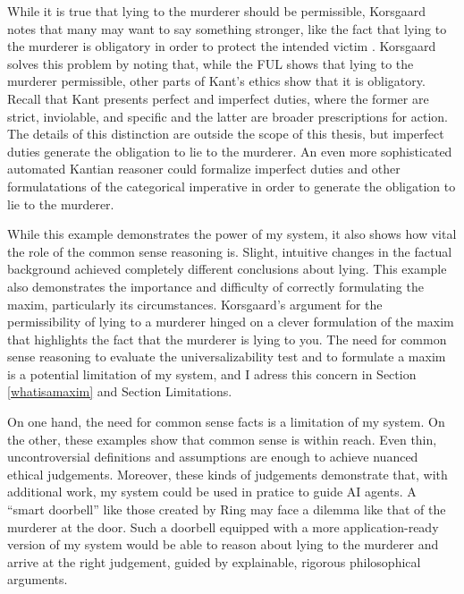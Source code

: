 \begin{isabellebody}
\begin{isamarkuptext}
{While it is true that lying to the murderer should be permissible, Korsgaard notes that many may want
to say something stronger, like the fact that lying to the murderer is obligatory in order to protect
the intended victim \citep[15]{KorsgaardRTL}. Korsgaard solves this problem by 
noting that, while the FUL shows that lying to the murderer permissible, other parts of Kant's ethics
show that it is obligatory. Recall that Kant presents perfect and imperfect duties,
where the former are strict, inviolable, and specific and the latter are broader prescriptions for action.
The details of this distinction are outside the scope of this thesis, but imperfect duties generate 
the obligation to lie to the murderer. An even more sophisticated automated Kantian reasoner could formalize 
imperfect duties and other formulatations of the categorical imperative in order to generate the 
obligation to lie to the murderer.}

While this example demonstrates the power of my system, it
also shows how vital the role of the common sense reasoning is. Slight, intuitive changes in the factual
background achieved completely different conclusions about lying. This example also demonstrates the importance
and difficulty of correctly formulating the maxim, particularly its circumstances.
Korsgaard's argument for the permissibility of lying to a 
murderer hinged on a clever formulation of the maxim that highlights the fact that the murderer is lying to you.
The need for common sense reasoning to evaluate the universalizability test and to formulate a maxim
is a potential limitation of my system, and I adress this concern in Section \ref{whatisamaxim} and 
Section Limitations.

On one hand, the need for common sense facts is a 
limitation of my system. On the other, these examples show that common sense is within reach. Even thin, 
uncontroversial definitions and assumptions are enough to achieve nuanced ethical judgements. Moreover, 
these kinds of judgements demonstrate that, with additional work, my system could be used in pratice 
to guide AI agents. A ``smart doorbell'' like those created by Ring may face a dilemma like that of 
the murderer at the door. Such a doorbell equipped with a more application-ready version of my 
system would be able to reason about lying to the murderer and arrive at the right judgement, guided by
explainable, rigorous philosophical arguments.%
\end{isamarkuptext}\isamarkuptrue%
%
\isadelimtheory
%
\endisadelimtheory
%
\isatagtheory
%
\endisatagtheory
{\isafoldtheory}%
%
\isadelimtheory
%
\endisadelimtheory
%
\end{isabellebody}%
